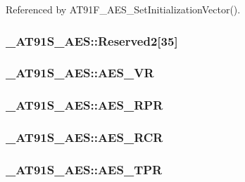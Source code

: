 Referenced by AT91F\_\-AES\_\-SetInitializationVector().\hypertarget{struct__AT91S__AES_8d76e3ee66850bf311bec78a28279ec2}{
\subsubsection{ {\bf \_\-AT91S\_\-AES::Reserved2}\mbox{[}35\mbox{]}}}
\label{struct__AT91S__AES_8d76e3ee66850bf311bec78a28279ec2}


\hypertarget{struct__AT91S__AES_ea9595f146dbffd775f26808eefb9bfe}{
\subsubsection{ {\bf \_\-AT91S\_\-AES::AES\_\-VR}}}
\label{struct__AT91S__AES_ea9595f146dbffd775f26808eefb9bfe}


\hypertarget{struct__AT91S__AES_0fe9c330f4053429e7ee4f6d56c9b190}{
\subsubsection{ {\bf \_\-AT91S\_\-AES::AES\_\-RPR}}}
\label{struct__AT91S__AES_0fe9c330f4053429e7ee4f6d56c9b190}


\hypertarget{struct__AT91S__AES_fb2500e2cbf02b292b4862b6d1408f32}{
\subsubsection{ {\bf \_\-AT91S\_\-AES::AES\_\-RCR}}}
\label{struct__AT91S__AES_fb2500e2cbf02b292b4862b6d1408f32}


\hypertarget{struct__AT91S__AES_dedcae263f269fc4254cf83ef66a39d3}{
\subsubsection{ {\bf \_\-AT91S\_\-AES::AES\_\-TPR}}}
\label{struct__AT91S__AES_dedcae263f269fc4254cf83ef66a39d3}


